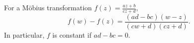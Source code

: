 For a Möbius transformation $f(z) = \frac{az+b}{cz+d}$,
$$f(w) - f(z) = \frac{(ad-bc)(w-z)}{(cw+d)(cz+d)}.$$
In particular, $f$ is constant if $ad-bc = 0$.
